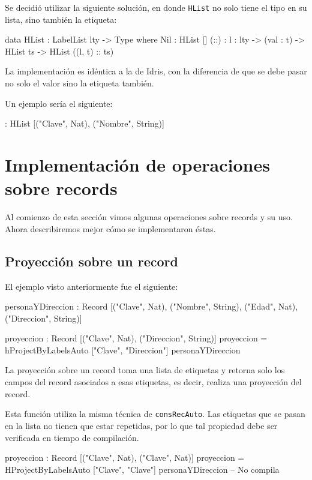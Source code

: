Se decidió utilizar la siguiente solución, en donde \texttt{HList} no solo tiene el tipo en su lista, sino también la etiqueta:

\begin{code}
data HList : LabelList lty -> Type where
  Nil : HList []
  (::) : {l : lty} -> (val : t) -> HList ts ->
    HList ((l, t) :: ts)
\end{code}

La implementación es idéntica a la de Idris, con la diferencia de que se debe pasar no solo el valor sino la etiqueta también.

Un ejemplo sería el siguiente:

\begin{code}
 :
  HList [("Clave", Nat), ("Nombre", String)]
\end{code}

\section{Implementación de operaciones sobre records}

Al comienzo de esta sección vimos algunas operaciones sobre records y su uso. Ahora describiremos mejor cómo se implementaron éstas.

\subsection{Proyección sobre un record}

El ejemplo visto anteriormente fue el siguiente:

\begin{code}
personaYDireccion : Record [("Clave", Nat), ("Nombre", String),
  ("Edad", Nat), ("Direccion", String)]

proyeccion : Record [("Clave", Nat), ("Direccion", String)]
proyeccion = hProjectByLabelsAuto ["Clave", "Direccion"]
  personaYDireccion
\end{code}

La proyección sobre un record toma una lista de etiquetas y retorna solo los campos del record asociados a esas etiquetas, es decir, realiza una proyección del record.

Esta función utiliza la misma técnica de \texttt{consRecAuto}. Las etiquetas que se pasan en la lista no tienen que estar repetidas, por lo que tal propiedad debe ser verificada en tiempo de compilación.

\begin{code}
proyeccion : Record [("Clave", Nat), ("Clave", Nat)]
proyeccion = HProjectByLabelsAuto ["Clave", "Clave"]
  personaYDireccion
-- No compila
\end{code}

